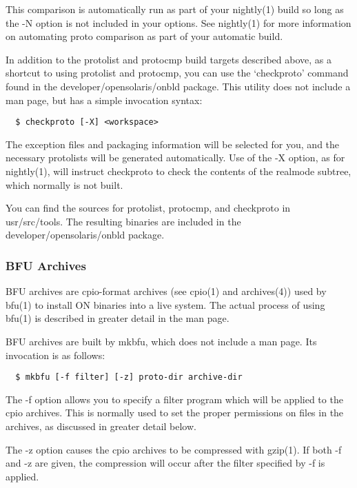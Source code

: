 \documentclass{article}
\begin{document}
This comparison is automatically run as part of your nightly(1) build so long
as the -N option is not included in your options. See nightly(1) for more
information on automating proto comparison as part of your automatic build.

In addition to the protolist and protocmp build targets described above, as a
shortcut to using protolist and protocmp, you can use the `checkproto' command
found in the developer/opensolaris/onbld package. This utility does not include
a man page, but has a simple invocation syntax:

\begin{verbatim}
  $ checkproto [-X] <workspace>
\end{verbatim}

The exception files and packaging information will be selected for you, and the
necessary protolists will be generated automatically. Use of the -X option, as
for nightly(1), will instruct checkproto to check the contents of the realmode
subtree, which normally is not built.

You can find the sources for protolist, protocmp, and checkproto in \\
usr/src/tools. The resulting binaries are included in the \\
developer/opensolaris/onbld package.

\subsubsection*{BFU Archives}

BFU archives are cpio-format archives (see cpio(1) and archives(4)) used by
bfu(1) to install ON binaries into a live system. The actual process of using
bfu(1) is described in greater detail in the man page.

BFU archives are built by mkbfu, which does not include a man page. Its invocation is as follows:

\begin{verbatim}
  $ mkbfu [-f filter] [-z] proto-dir archive-dir
\end{verbatim}

The -f option allows you to specify a filter program which will be applied to
the cpio archives. This is normally used to set the proper permissions on files
in the archives, as discussed in greater detail below.

The -z option causes the cpio archives to be compressed with gzip(1). If both
-f and -z are given, the compression will occur after the filter specified by
-f is applied.
\end{document}
